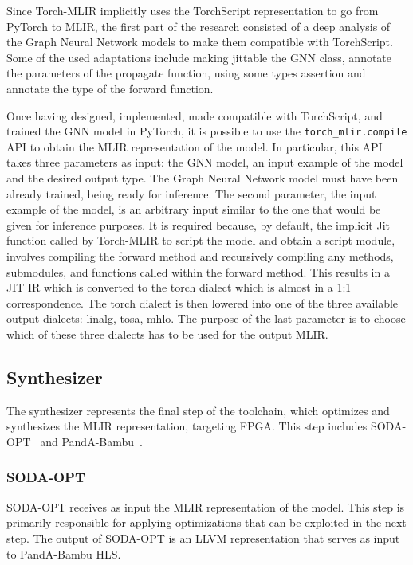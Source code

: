 \documentclass[11pt,a4paper,twocolumn]{article}
\begin{document}
Since Torch-MLIR implicitly uses the TorchScript representation to go from PyTorch to MLIR, the first part of the research consisted of a deep analysis of the Graph Neural Network models to make them compatible with TorchScript.
Some of the used adaptations include making jittable the GNN class, annotate the parameters of the propagate function, using some types assertion and annotate the type of the forward function.

Once having designed, implemented, made compatible with TorchScript, and trained the GNN model in PyTorch, it is possible to use the \lstinline{torch_mlir.compile} API to obtain the MLIR representation of the model.
In particular, this API takes three parameters as input: the GNN model, an input example of the model and the desired output type.
The Graph Neural Network model must have been already trained, being ready for inference.
The second parameter, the input example of the model, is an arbitrary input similar to the one that would be given for inference purposes.
It is required because, by default, the implicit Jit function called by Torch-MLIR to script the model and obtain a script module, involves compiling the forward method and recursively compiling any methods, submodules, and functions called within the forward method. This results in a JIT IR which is converted to the torch dialect which is almost in a 1:1 correspondence.
The torch dialect is then lowered into one of the three available output dialects: linalg, tosa, mhlo.
The purpose of the last parameter is to choose which of these three dialects has to be used for the output MLIR\@.

\subsection{Synthesizer}
\label{subsec:synthesizer-toolchain}%

The synthesizer represents the final step of the toolchain, which optimizes and synthesizes the MLIR representation, targeting FPGA\@.
This step includes SODA-OPT~\cite{9786533} and PandA-Bambu~\cite{9586110}.

\subsubsection*{SODA-OPT}

SODA-OPT receives as input the MLIR representation of the model.
This step is primarily responsible for applying optimizations that can be exploited in the next step.
The output of SODA-OPT is an LLVM representation that serves as input to PandA-Bambu HLS\@.
\end{document}
